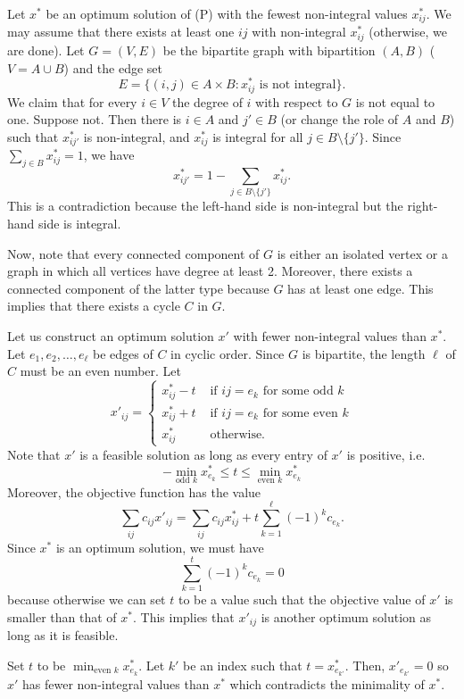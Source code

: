 \documentclass[12pt]{article}
\begin{document}
\begin{enumerate}
Let $x^*$ be an optimum solution of (P) with the fewest non-integral values $x^*_{ij}$. We may assume that there exists at least one $ij$ with non-integral $x^*_{ij}$ (otherwise, we are done). Let $G = (V, E)$ be the bipartite graph with bipartition $(A, B)$ ($V = A \cup B$) and the edge set
$$
E = \{ (i, j)\in A \times B: x^*_{ij} \text{ is not integral}\}.
$$
We claim that for every $i \in V$ the degree of $i$ with respect to $G$ is not equal to one. Suppose not. Then there is $i \in A$ and $j' \in B$ (or change the role of $A$ and $B$) such that $x^*_{ij'}$ is non-integral, and $x^*_{ij}$ is integral for all $j \in B \setminus \{j'\}$. Since $\sum_{j\in B} x^*_{ij} = 1$, we have
$$
x^*_{ij'} = 1- \sum_{j \in B \setminus \{j'\}} x^*_{ij}.
$$
This is a contradiction because the left-hand side is non-integral but the right-hand side is integral.

Now, note that every connected component of $G$ is either an isolated vertex or a graph in which all vertices have degree at least 2. Moreover, there exists a connected component of the latter type because $G$ has at least one edge. This implies that there exists a cycle $C$ in $G$.

Let us construct an optimum solution $x'$ with fewer non-integral values than $x^*$. Let $e_1,e_2,\dotsc,e_\ell$ be edges of $C$ in cyclic order. Since $G$ is bipartite, the length $\ell$ of $C$ must be an even number. Let
$$
x'_{ij} = \begin{cases}
x_{ij}^* - t & \text{ if $ij = e_{k}$ for some odd $k$} \\
x_{ij}^* + t & \text{ if $ij = e_{k}$ for some even $k$} \\
x_{ij}^* & \text{ otherwise.}
\end{cases}
$$
Note that $x'$ is a feasible solution as long as every entry of $x'$ is positive, i.e.
$$
-\min_{\text{odd } k} x_{e_{k}}^* \leq t \leq \min_{\text{even }k} x_{e_{k}}^*
$$
Moreover, the objective function has the value
$$
\sum_{ij} c_{ij} x'_{ij} = \sum_{ij} c_{ij} x^*_{ij} + t \sum_{k=1}^{\ell} (-1)^k c_{e_k}.
$$
Since $x^*$ is an optimum solution, we must have
$$
\sum_{k=1}^t (-1)^k c_{e_k} = 0
$$
because otherwise we can set $t$ to be a value such that the objective value of $x'$ is smaller than that of $x^*$. This implies that $x'_{ij}$ is another optimum solution as long as it is feasible.

Set $t$ to be $\min_{\text{even $k$}} x_{e_k}^*$. Let $k'$ be an index such that $t = x_{e_{k'}}^*$. Then, $x'_{e_{k'}} = 0$ so $x'$ has fewer non-integral values than $x^*$ which contradicts the minimality of $x^*$.


\end{enumerate}
\end{document}

